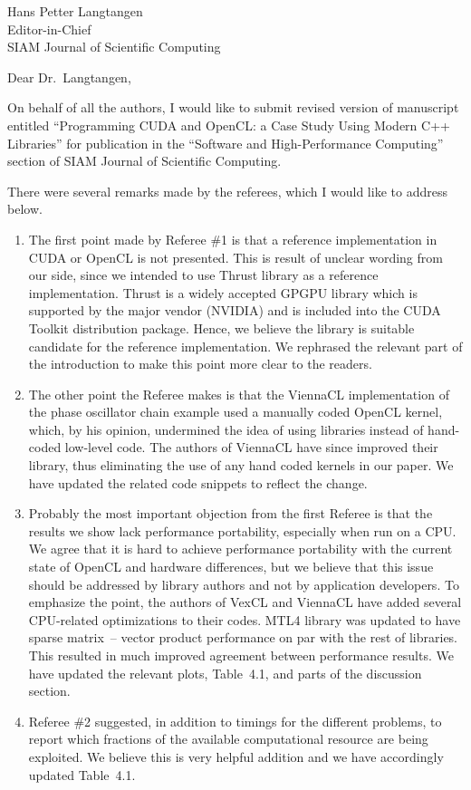 \documentclass[a4paper,11pt]{letter}
\begin{document}
\begin{letter}{
    Hans Petter Langtangen\\
    Editor-in-Chief\\
    SIAM Journal of Scientific Computing
    }
\opening{Dear Dr.~Langtangen,}

On behalf of all the authors, I would like to submit revised version of
manuscript entitled ``Programming CUDA and OpenCL: a Case Study Using Modern
C++ Libraries'' for publication in the ``Software and High-Performance
Computing'' section of SIAM Journal of Scientific Computing.

There were several remarks made by the referees, which I would like to address
below.

\begin{enumerate}
    \item The first point made by Referee \#1 is that a reference
        implementation in CUDA or OpenCL is not presented. This is result of
        unclear wording from our side, since we intended to use Thrust library
        as a reference implementation. Thrust is a widely accepted GPGPU
        library which is supported by the major vendor (NVIDIA) and is included
        into the CUDA Toolkit distribution package. Hence, we believe the
        library is suitable candidate for the reference implementation. We
        rephrased the relevant part of the introduction to make this point more
        clear to the readers.
    \item The other point the Referee makes is that the ViennaCL implementation of
        the phase oscillator chain example used a manually coded OpenCL kernel,
        which, by his opinion, undermined the idea of using libraries instead
        of hand-coded low-level code. The authors of ViennaCL have since
        improved their library, thus eliminating the use of any hand coded kernels
        in our paper. We have updated the related code snippets to reflect the
        change.
    \item Probably the most important objection from the first Referee is that
        the results we show lack performance portability, especially when run
        on a CPU. We agree that it is hard to achieve performance portability
        with the current state of OpenCL and hardware differences, but we believe
        that this issue should be addressed by library authors and not by
        application developers. To emphasize the point, the authors of VexCL and
        ViennaCL have added several CPU-related optimizations to
        their codes. MTL4 library was updated to have sparse matrix~-- vector
        product performance on par with the rest of libraries.  This resulted
        in much improved agreement between performance results. We have updated
        the relevant plots, Table~4.1, and parts of the discussion section.
    \item Referee \#2 suggested, in addition to timings for the different
        problems, to report which fractions of the available computational
        resource are being exploited. We believe this is very helpful addition
        and we have accordingly updated Table~4.1.
\end{enumerate}


\end{letter}
\end{document}
